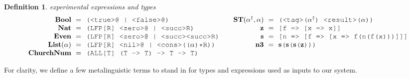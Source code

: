 \documentclass[acmsmall]{acmart}
\theoremstyle{definition}
\newtheorem{definition}{Definition}[section]
\begin{document}
\begin{definition} 
  \label{def:experimental_expressions_and_types}
  \emph{experimental expressions and types} 
  \scriptsize
  \nopad
  \[
  \begin{array}[t]{ll}
    \begin{array}[t]{r@{}c@{}l}
      \textbf{Bool} 
      &\ \ =\ \ & 
      \J{(<true>@ | <false>@)} 
      \\
      \textbf{Nat} 
      &\ \ =\ \ & 
      \J{(LFP[R] <zero>@ | <succ>R)} 
      \\
      \textbf{Even} 
      &\ \ =\ \ & 
      \J{(LFP[R] <zero>@ | <succ><succ>R)} 
      \\
      \textbf{List}(\alpha) 
      &\ \ =\ \ & 
      \J{(LFP[R] <nil>@ | <cons>((}\alpha\J{)*R))} 
      \\
      \textbf{ChurchNum} 
      &\ \ =\ \ & 
      \J{(ALL[T] (T -> T) -> T -> T)}
    \end{array}
    &
    \begin{array}[t]{r@{}c@{}l}
      \textbf{ST}(\alpha^\dagger, \alpha) 
      &\ \ =\ \ & 
      \J{(<tag>(}\alpha^\dagger \J{) <result>(} \alpha \J{))}
      \\
      \textbf{z} 
      &\ \ =\ \ & 
      \J{[f => [x => x]]} 
      \\
      \textbf{s} 
      &\ \ =\ \ & 
      \J{[n => [f => [x => f(n(f(x)))]]]} 
      \\
      \textbf{n3} 
      &\ \ =\ \ & 
      \textbf{s}\J{(}\textbf{s}\J{(}\textbf{s}\J{(}\textbf{z}\J{)}\J{)}\J{)} 
    \end{array}
  \end{array}
  \]
\end{definition}

\noindent
For clarity, we define a few metalinguistic terms to stand in for 
types and expressions used as inputs to our system. 
\end{document}
